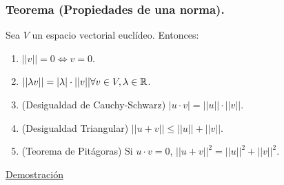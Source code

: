 \documentclass[12pt, a4paper, ones, notitlepage, openany,titlepage]{article}
\newcommand{\demostracion}{\noindent\underline{Demostración}}
\begin{document}
\subsubsection{Teorema (Propiedades de una norma).}
Sea $V$ un espacio vectorial euclídeo. Entonces:
\begin{enumerate}
	\item $||v|| = 0 \Longleftrightarrow v = 0$.
	\item $||\lambda v|| = |\lambda| \cdot ||v|| \space \forall v \in V, \lambda \in \mathbb{R}$.
	\item (Desigualdad de Cauchy-Schwarz) 
	$|u \cdot v| = ||u|| \cdot ||v||$.
	\item (Desigualdad Triangular) $||u + v|| \le ||u|| + ||v||$.
	\item (Teorema de Pitágoras) Si $u \cdot v = 0$, $||u + v||^{2} = ||u||^{2} + ||v||^{2}$.
\end{enumerate}
\demostracion
\end{document}
